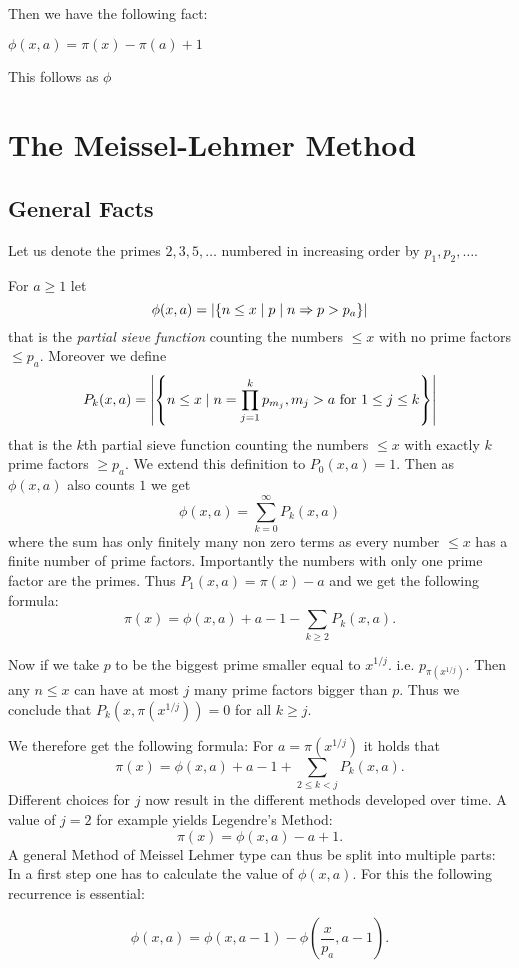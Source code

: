 Then we have the following fact:
\begin{fact}
	$\phi(x,a) = \pi(x) - \pi(a) +1$
\end{fact}

This follows as $\phi$ 
\section{The Meissel-Lehmer Method}

\subsection{General Facts}
\begin{definition}
Let us denote the primes $2,3,5,\ldots$ numbered in increasing order by $p_1,p_2,\ldots$.

For $a \geq 1$ let
\[
	\phi(x,a) = \abs{\{n \leq x \mid p \mid n \Rightarrow p > p_{a}\}}
\] 
that is the \emph{partial sieve function} counting the numbers $\leq x$ with no prime factors $\leq p_{a}$.
Moreover we define 
\[
	P_{k}(x,a) = \abs{\left\{n \leq x \mid n = \prod_{j=1}^{k} p_{m_{j}}, m_{j} > a \text{ for } 1 \leq j \leq k\right\} }
\] 
that is the $k$th partial sieve function counting the numbers $\leq x$ with exactly $k$ prime factors $\geq p_{a}$.
We extend this definition to $P_{0}(x,a) = 1$. Then as $\phi(x,a)$ also counts $1$ we get
\[
	\phi(x,a) = \sum_{k=0}^{\infty} P_{k}(x,a)
\] 
where the sum has only finitely many non zero terms as every number $\leq x$ has a finite number of prime factors.
Importantly the numbers with only one prime factor are the primes. Thus $P_{1}(x,a) = \pi(x) - a$ and we get the following formula:
\[
	\pi(x) = \phi(x,a) +a - 1 - \sum_{k \geq 2} P_{k}(x,a)  
.\] 
\end{definition}

Now if we take $p$ to be the biggest prime smaller equal to $x^{1 / j}$. i.e. $p_{\pi(x^{1 / j})}$.
Then any $n \leq x$ can have at most $j$ many prime factors bigger than $p$. Thus we conclude that $P_{k}(x,\pi(x^{1 / j})) = 0$ for all $k \geq j$.

We therefore get the following formula:
For $a = \pi(x^{1 / j})$ it holds that
\[
	\pi(x) = \phi(x,a) + a - 1 + \sum_{2 \leq k < j} P_{k}(x,a) 
.\] 
Different choices for $j$ now result in the different methods developed over time.
A value of $j=2$ for example yields Legendre's Method:
\[
	\pi(x) = \phi(x,a) -a +1
.\]
A general Method of Meissel Lehmer type can thus be split into multiple parts:
In a first step one has to calculate the value of $\phi(x,a)$. For this the following recurrence is essential:
\begin{lemma}
	 \[
		 \phi(x,a) = \phi(x,a-1) - \phi(\frac{x}{p_{a}}, a-1)
	.\] 
\end{lemma}

